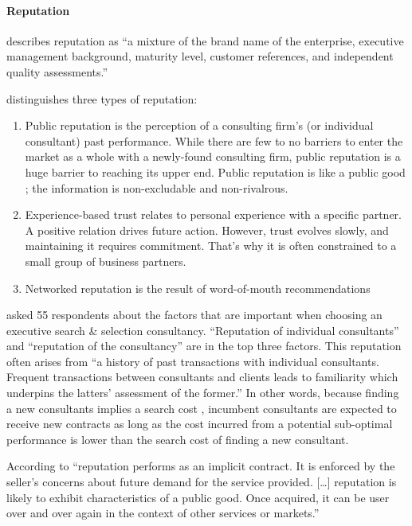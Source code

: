\documentclass[12pt]{article}
\providecommand{\tightlist}{%
  \setlength{\itemsep}{0pt}\setlength{\parskip}{0pt}}
\begin{document}
\hypertarget{reputation}{%
\paragraph{Reputation}\label{reputation}}

\citet[193]{kirilov2012} describes reputation as ``a mixture of the
brand name of the enterprise, executive management background, maturity
level, customer references, and independent quality assessments.''

\citet[75-76]{armbruster2006} distinguishes three types of reputation:

\begin{enumerate}
\def\labelenumi{\arabic{enumi}.}
\tightlist
\item
  Public reputation is the perception of a consulting firm's (or
  individual consultant) past performance. While there are few to no
  barriers to enter the market as a whole with a newly-found consulting
  firm, public reputation is a huge barrier to reaching its upper end.
  Public reputation is like a public good ; the information is
  non-excludable and non-rivalrous.
\item
  Experience-based trust relates to personal experience with a specific
  partner. A positive relation drives future action. However, trust
  evolves slowly, and maintaining it requires commitment. That's why it
  is often constrained to a small group of business partners.
\item
  Networked reputation is the result of word-of-mouth recommendations
\end{enumerate}

\citet[243-244]{clark1993} asked 55 respondents about the factors that
are important when choosing an executive search \& selection
consultancy. ``Reputation of individual consultants'' and ``reputation
of the consultancy'' are in the top three factors. This reputation often
arises from ``a history of past transactions with individual
consultants. Frequent transactions between consultants and clients leads
to familiarity which underpins the latters' assessment of the former.''
In other words, because finding a new consultants implies a search cost
\citep[ 1072]{wilson2012}, incumbent consultants are expected to receive
new contracts as long as the cost incurred from a potential sub-optimal
performance is lower than the search cost of finding a new consultant.

According to \citet[516]{nayyar1990} ``reputation performs as an
implicit contract. It is enforced by the seller's concerns about future
demand for the service provided. {[}\ldots{]} reputation is likely to
exhibit characteristics of a public good. Once acquired, it can be user
over and over again in the context of other services or markets.''
\end{document}
